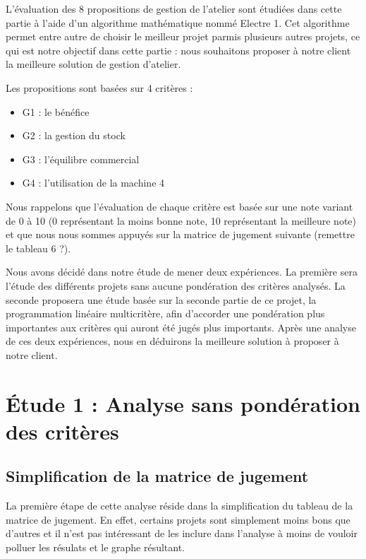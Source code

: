 \documentclass[a4paper,10pt]{article}
\begin{document}
L'évaluation des 8 propositions de gestion de l'atelier sont étudiées dans cette partie à l'aide d'un algorithme mathématique nommé Electre 1. Cet algorithme permet entre autre de choisir le meilleur projet parmis plusieurs autres projets, ce qui est notre objectif dans cette partie : nous souhaitons proposer à notre client la meilleure solution de gestion d'atelier.

Les propositions sont basées sur 4 critères  :
\begin{itemize}
\item G1 : le bénéfice
\item G2 : la gestion du stock
\item G3 : l'équilibre commercial
\item G4 : l'utilisation de la machine 4
\end{itemize}

Nous rappelons que l'évaluation de chaque critère est basée sur une note variant de 0 à 10 (0 représentant la moins bonne note, 10 représentant la meilleure note) et que nous nous sommes appuyés sur la matrice de jugement suivante (remettre le tableau 6 ?).


Nous avons décidé dans notre étude de mener deux expériences. La première sera l'étude des différents projets sans aucune pondération des critères analysés. La seconde proposera une étude basée sur la seconde partie de ce projet, la programmation linéaire multicritère, afin d'accorder une pondération plus importantes aux critères qui auront été jugés plus importants. Après une analyse de ces deux expériences, nous en déduirons la meilleure solution à proposer à notre client.

\section{Étude 1 : Analyse sans pondération des critères}

\subsection{Simplification de la matrice de jugement}

La première étape de cette analyse réside dans la simplification du tableau de la matrice de jugement. En effet, certains projets sont simplement moins bons que d'autres et il n'est pas intéressant de les inclure dans l'analyse à moins de vouloir polluer les résulats et le graphe résultant.
\end{document}
